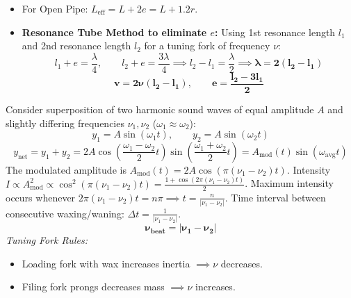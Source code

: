 \documentclass[10pt,twoside,openright]{book}
\begin{document}
\begin{formulabox}
\begin{itemize}
  \item For Open Pipe: $L_{\text{eff}} = L + 2e = L + 1.2r$.
  \item \textbf{Resonance Tube Method to eliminate $e$:}
  Using 1st resonance length $l_1$ and 2nd resonance length $l_2$ for a tuning fork of frequency $\nu$:
  \begin{equation}
    l_1 + e = \frac{\lambda}{4}, \qquad l_2 + e = \frac{3\lambda}{4} \implies l_2 - l_1 = \frac{\lambda}{2} \implies \mathbf{\lambda = 2(l_2 - l_1)}
  \end{equation}
  \begin{equation}
    \mathbf{v = 2\nu(l_2 - l_1)}, \qquad \mathbf{e = \frac{l_2 - 3l_1}{2}}
  \end{equation}
\end{itemize}
\end{formulabox}

\begin{formulabox}
Consider superposition of two harmonic sound waves of equal amplitude $A$ and slightly differing frequencies $\nu_1, \nu_2$ ($\omega_1 \approx \omega_2$):
\begin{equation}
  y_1 = A\sin(\omega_1 t), \qquad y_2 = A\sin(\omega_2 t)
\end{equation}
\begin{equation}
  y_{\text{net}} = y_1 + y_2 = 2A \cos\left(\frac{\omega_1 - \omega_2}{2}t\right) \sin\left(\frac{\omega_1 + \omega_2}{2}t\right) = A_{\text{mod}}(t) \sin(\omega_{\text{avg}} t)
\end{equation}
The modulated amplitude is $A_{\text{mod}}(t) = 2A \cos(\pi(\nu_1 - \nu_2)t)$.
Intensity $I \propto A_{\text{mod}}^2 \propto \cos^2(\pi(\nu_1 - \nu_2)t) = \frac{1 + \cos(2\pi(\nu_1 - \nu_2)t)}{2}$.
Maximum intensity occurs whenever $2\pi(\nu_1 - \nu_2)t = n\pi \implies t = \frac{n}{|\nu_1 - \nu_2|}$.
Time interval between consecutive waxing/waning: $\Delta t = \frac{1}{|\nu_1 - \nu_2|}$.
\begin{equation}
  \mathbf{\nu_{\text{beat}} = |\nu_1 - \nu_2|}
\end{equation}
\textit{Tuning Fork Rules:}
\begin{itemize}
  \item Loading fork with wax increases inertia $\implies \nu$ decreases.
  \item Filing fork prongs decreases mass $\implies \nu$ increases.
\end{itemize}
\end{formulabox}
\end{document}
